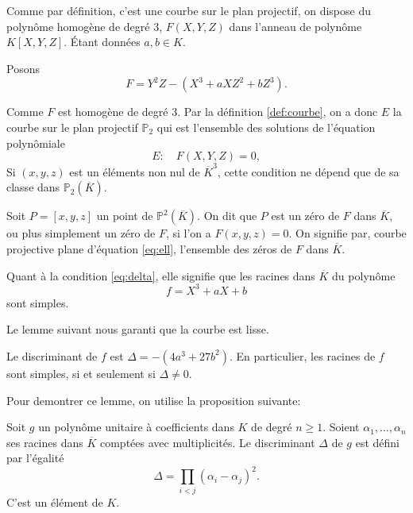 Comme par définition, c'est une courbe sur le plan projectif, on dispose du polynôme homogène
de degré $3$, $F(X,Y,Z)$ dans l'anneau de polynôme $K[X,Y,Z]$. Étant données $ a,b \in K$. 

Posons 
\[
F=Y^2Z-\left( X^3+aXZ^2+bZ^3 \right) 
.\] 

Comme $F$ est homogène de degré $3$. Par la définition \eqref{def:courbe}, on a donc
$E$ la courbe sur le plan projectif $\mathbb{P}_{2}$ qui est l'ensemble des solutions de l'équation
polynômiale
\[
E: \quad F(X,Y,Z) = 0
,\] 
Si $\left( x,y,z \right) $ est un éléments non nul de $\overline{K}^3$, cette condition
ne dépend que de sa classe dans $\mathbb{P}_{2}(\overline{K})$.

Soit $P = \left[ x,y,z \right] $ un point de $\mathbb{P}^2(\overline{K})$. On
dit que $P$ est un zéro de $F$ dans $\overline{K}$, ou plus simplement un zéro de $F$, si
l'on a $F(x,y,z)=0$. On signifie par, courbe projective plane d'équation \eqref{eq:ell},
l'ensemble des zéros de $F$ dans $\overline{K}$.

Quant à la condition \eqref{eq:delta}, elle signifie que les racines dans $\overline{K}$ du
polynôme
\[
f = X^3 + aX + b
\] 
sont simples.

Le lemme suivant nous garanti que la courbe est lisse.
\begin{lemme}
    \label{lem:lemme1}
    Le discriminant de $f$ est $\Delta = -(4a^3 + 27b^2)$. En particulier, les racines de $f$ sont simples, si et seulement si $\Delta \neq 0$.
\end{lemme}

Pour demontrer ce lemme, on utilise la proposition suivante:
\begin{proposition}
    \label{prop:discriminant}
    Soit $g$ un polynôme unitaire à coefficients dans $K$ de degré $n \ge 1$. Soient
    $\alpha_1,\ldots,\alpha_{n}$ ses racines dans $\overline{K}$ comptées avec
    multiplicités. Le discriminant $\Delta$ de $g$ est défini par l'égalité
    \[
    \Delta = \prod_{i<j}^{} \left( \alpha_{i} - \alpha_{j} \right) ^2 
    .\] 
    C'est un élément de $K$.
\end{proposition}

